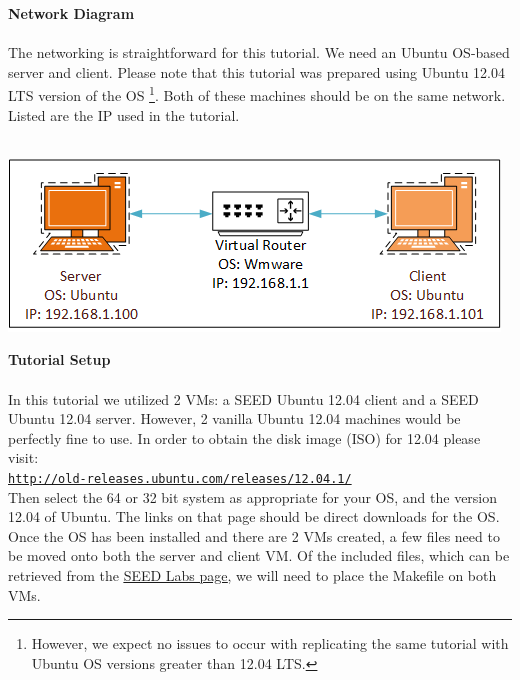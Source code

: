 \documentclass[12pt]{extarticle}
\begin{document}
\pagebreak
\noindent
\Large{\textbf{Network Diagram}}\\\\
\normalsize
The networking is straightforward for this tutorial. We need an Ubuntu OS-based server and client. Please note that this tutorial was prepared using Ubuntu 12.04 LTS version of the OS {\footnote{However, we expect no issues to occur with replicating the same tutorial with Ubuntu OS versions greater than 12.04 LTS.}}. Both of these machines should be on the same network. Listed are the IP used in the tutorial.\\
\vspace*{20mm}\\
\begin{center}
\includegraphics{NetworkDiagram}
\end{center}

\pagebreak
\noindent
{\Large{\textbf{Tutorial Setup}}}\\\\

\noindent
In this tutorial we utilized 2 VMs: a SEED Ubuntu 12.04 client and a SEED Ubuntu 12.04 server. However, 2 vanilla Ubuntu 12.04 machines would be perfectly fine to use. In order to obtain the disk image (ISO) for 12.04 please visit:\\ 

\href{http://old-releases.ubuntu.com/releases/12.04.1/}{\texttt{http://old-releases.ubuntu.com/releases/12.04.1/}}\\

Then select the 64 or 32 bit system as appropriate for your OS, and the version 12.04 of Ubuntu. The links on that page should be direct downloads for the OS. Once the OS has been installed and there are 2 VMs created, a few files need to be moved onto both the server and client VM. Of the included files, which can be retrieved from the \href{http://www.cis.syr.edu/~wedu/seed/Labs_12.04/Crypto/Crypto_PublicKey/}{\underline{SEED Labs page}}, we will need to place the Makefile on both VMs. 
\end{document}
